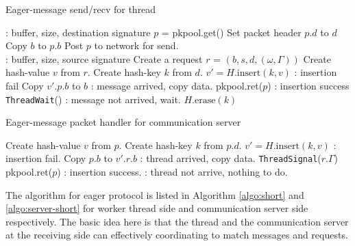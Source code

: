 \documentclass{sig-alternate-05-2015}
\begin{document}
\begin{algorithm}
  \caption{Eager-message send/recv for thread}
  \label{algo:short}
  \begin{algorithmic}[1] %
     \Comment: buffer, size, destination signature 
      \State $p$ = pkpool.get()
      \State Set packet header $p.d$ to $d$
      \State Copy $b$ to $p.b$
      \State Post $p$ to network for send.
    \EndProcedure
    \\
     \Comment: buffer, size, source signature 
      \State Create a request $r$ = $(b,s,d, (\omega, \Gamma))$
      \State Create hash-value $v$ from $r$.
      \State Create hash-key $k$ from $d$.
      \State $v' = H.\text{insert}(k,v)$
        \Comment: insertion fail
        \State Copy $v'.p.b$ to $b$
        \Comment: message arrived, copy data.
        \State pkpool.ret($p$)
      \Else
        \Comment: insertion success
        \State \texttt{ThreadWait}()
        \Comment: message not arrived, wait.
      \EndIf
      \State $H.\text{erase}(k)$
    \EndProcedure
  \end{algorithmic}
\end{algorithm}

\begin{algorithm}
  \caption{Eager-message packet handler for communication server}
  \label{algo:server-short}
  \begin{algorithmic}[1]
      \State Create hash-value $v$ from $p$.
      \State Create hash-key $k$ from $p.d$.
      \State $v' = H.\text{insert}(k,v)$
        \Comment: insertion fail.
        \State Copy $p.b$ to $v'.r.b$
        \Comment: thread arrived, copy data.
        \State \texttt{ThreadSignal}($r.\Gamma$)
        \State pkpool.ret($p$)
      \Else
        \Comment: insertion success.
        \State \Return
        \Comment: thread not arrive, nothing to do.
      \EndIf
    \EndProcedure
  \end{algorithmic}
\end{algorithm}

The algorithm for eager protocol is listed in Algorithm \ref{algo:short} and
\ref{algo:server-short} for worker thread side and communication server side
respectively. The basic idea here is that the thread and the communication
server at the receiving side can effectively coordinating to match messages and
requests.
\end{document}
